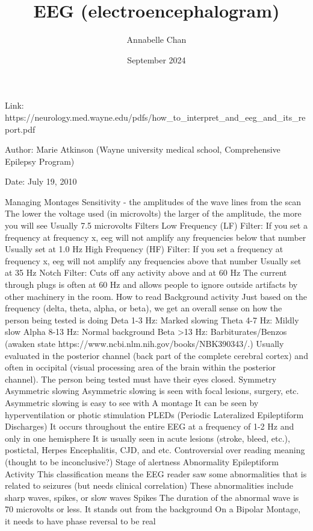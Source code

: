 \documentclass[12pt]{article}
\title{EEG (electroencephalogram)}
\author{Annabelle Chan}
\date{September 2024}
\begin{document}
\maketitle
Link: https://neurology.med.wayne.edu/pdfs/how\_to\_interpret\_and\_eeg\_and\_its\_report.pdf

Author: Marie Atkinson (Wayne university medical school, Comprehensive Epilepsy Program)

Date: July 19, 2010

Managing 
Montages 
Sensitivity - the amplitudes of the wave lines from the scan
The lower the voltage used (in microvolts) the larger of the amplitude, the more you will see 
Usually 7.5 microvolts
Filters
Low Frequency (LF) Filter: 
If you set a frequency at frequency x, eeg will not amplify any frequencies below that number
Usually set at 1.0 Hz
High Frequency (HF) Filter:
If you set a frequency at frequency x, eeg will not amplify any frequencies above that number
Usually set at 35 Hz
Notch Filter:	
Cuts off any activity above and at 60 Hz
The current through plugs is often at 60 Hz and allows people to ignore outside artifacts by other machinery in the room.
How to read 
Background activity
Just based on the frequency (delta, theta, alpha, or beta), we get an overall sense on how the person being tested is doing
Deta 1-3 Hz: Marked slowing
Theta 4-7 Hz: Mildly slow 
Alpha 8-13 Hz: Normal background
Beta >13 Hz: Barbiturates/Benzos (awaken state https://www.ncbi.nlm.nih.gov/books/NBK390343/.)
Usually evaluated in the posterior channel (back part of the complete cerebral cortex) and often in occipital (visual processing area of the brain within the posterior channel).
The person being tested must have their eyes closed.
Symmetry
Asymmetric slowing
Asymmetric slowing is seen with focal lesions, surgery, etc.
Asymmetric slowing is easy to see with A montage
It can be seen by hyperventilation or photic stimulation 
PLEDs (Periodic Lateralized Epileptiform Discharges)
It occurs throughout the entire EEG at a frequency of 1-2 Hz and only in one hemisphere
It is usually seen in acute lesions (stroke, bleed, etc.), postictal, Herpes Encephalitis, CJD, and etc.
Controversial over reading meaning (thought to be inconclusive?)
Stage of alertness
Abnormality
Epileptiform Activity
This classification means the EEG reader saw some abnormalities that is related to seizures (but needs clinical correlation)
These abnormalities include sharp waves, spikes, or slow waves
 Spikes
The duration of the abnormal wave is 70 microvolts or less.
It stands out from the background
On a Bipolar Montage, it needs to have phase reversal to be real
\end{document}
